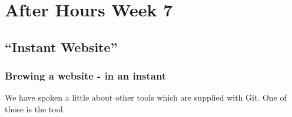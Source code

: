 \chapter{After Hours Week 7}
\section{``Instant Website''}
\subsection{Brewing a website - in an instant}
We have spoken a little about other tools which are supplied with Git.
One of those is the  tool.
